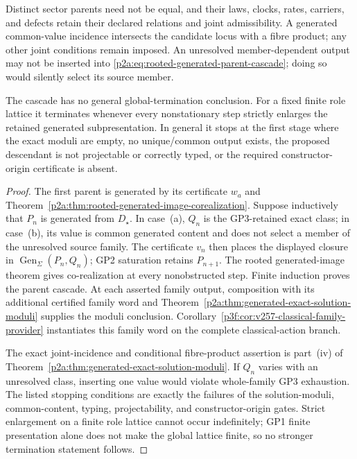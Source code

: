 \documentclass[12pt,a4paper]{article}
\begin{document}
\begin{theorem}
Distinct sector parents need not be equal, and their laws, clocks, rates,
carriers, and defects retain their declared relations and joint admissibility.
A generated common-value incidence intersects the candidate locus with a
fibre product; any other joint conditions remain imposed.  An unresolved
member-dependent output may not be inserted into
\eqref{p2a:eq:rooted-generated-parent-cascade}; doing so would silently select
its source member.

The cascade has no general global-termination conclusion.  For a fixed finite
role lattice it terminates whenever every nonstationary step strictly enlarges
the retained generated subpresentation.  In general it stops at the first
stage where the exact moduli are empty, no unique/common output exists, the
proposed descendant is not projectable or correctly typed, or the required
constructor-origin certificate is absent.
\end{theorem}

\begin{proof}
The first parent is generated by its certificate $w_a$ and
Theorem~\ref{p2a:thm:rooted-generated-image-corealization}.  Suppose inductively
that \(P_n\) is generated from \(D_\star\).  In case~(a), \(Q_n\) is the
GP3-retained exact class; in case~(b), its value is common generated content
and does not select a member of the unresolved source family.  The certificate
\(v_n\) then places the displayed closure in
\(\operatorname{Gen}_{\Sigma}(P_n,Q_n)\); GP2 saturation retains
\(P_{n+1}\).  The rooted generated-image theorem gives co-realization at every
nonobstructed step. Finite induction proves the parent cascade. At each
asserted family output, composition with its additional certified family
word and Theorem~\ref{p2a:thm:generated-exact-solution-moduli} supplies the
moduli conclusion. Corollary~\ref{p3f:cor:v257-classical-family-provider}
instantiates this family word on the complete classical-action branch.

The exact joint-incidence and conditional fibre-product assertion is part~(iv) of
Theorem~\ref{p2a:thm:generated-exact-solution-moduli}.  If \(Q_n\) varies with
an unresolved class, inserting one value would violate whole-family GP3
exhaustion.  The listed stopping conditions are exactly the failures of the
solution-moduli, common-content, typing, projectability, and constructor-origin
gates.  Strict enlargement on a finite role lattice cannot occur
indefinitely; GP1 finite presentation alone does not make the global lattice
finite, so no stronger termination statement follows.
\end{proof}
\end{document}
